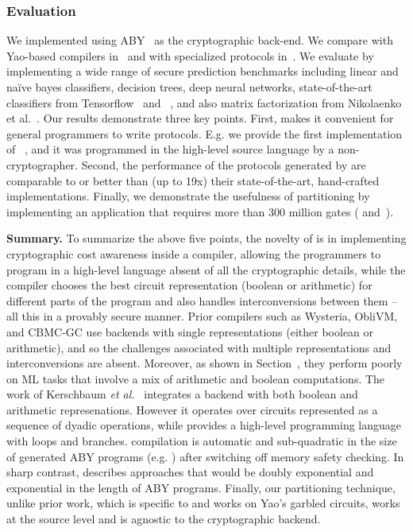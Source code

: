 \subsubsection{Evaluation}We implemented \tool
using ABY~\cite{aby} as the
cryptographic back-end.
We compare \tool with Yao-based compilers in~
and with specialized protocols in~. 
 We evaluate \tool by implementing a wide range
of secure prediction benchmarks including linear and na\"{i}ve bayes
classifiers, decision trees, deep neural networks, state-of-the-art
classifiers from Tensorflow~\cite{tensorflow}
and \bonsai~\cite{bonsai}, and also matrix factorization from Nikolaenko et al.~\cite{valeriaMatrix}. Our results demonstrate
three key points. First, \tool makes it convenient for general
programmers to write \mpc protocols. E.g. we provide the first \mpc
implementation of \bonsai~\cite{bonsai}, and it was programmed in the
high-level \tool source language by a non-cryptographer. Second, the
performance
of the protocols
generated by \tool are comparable to or better than (up to 19x) their state-of-the-art, hand-crafted implementations. Finally, we
demonstrate the usefulness of partitioning by implementing an application
that requires more than 300 million gates ( and~).

\noindent\textbf{Summary.} To summarize the above five points, the novelty of \tool is in implementing cryptographic cost awareness inside a compiler, allowing the programmers to program in a high-level language absent of all the cryptographic details, while the compiler chooses the best circuit representation (boolean or arithmetic) for different parts of the program and also handles interconversions between them -- all this in a provably secure manner. Prior compilers such as Wysteria, ObliVM, and CBMC-GC use backends with single representations (either boolean or arithmetic), and so the  challenges associated with multiple representations and interconversions are absent. Moreover, as shown in Section~, they perform poorly on ML tasks that involve a mix of arithmetic and boolean computations. The work of Kerschbaum {\em et al.}~\cite{autoS} integrates a backend with both boolean and arithmetic represenations. However it operates over circuits represented as a sequence of dyadic operations, while \tool provides a high-level programming language with loops and branches. \tool compilation is automatic and sub-quadratic in the size of generated ABY programs (e.g. ) after switching off memory safety checking. In sharp contrast, \cite{autoS} describes approaches that would be doubly exponential and exponential in the length of ABY programs. Finally, our partitioning technique, unlike prior work, which is specific to and works on Yao’s garbled circuits, works at the source level and is agnostic to the cryptographic backend.

